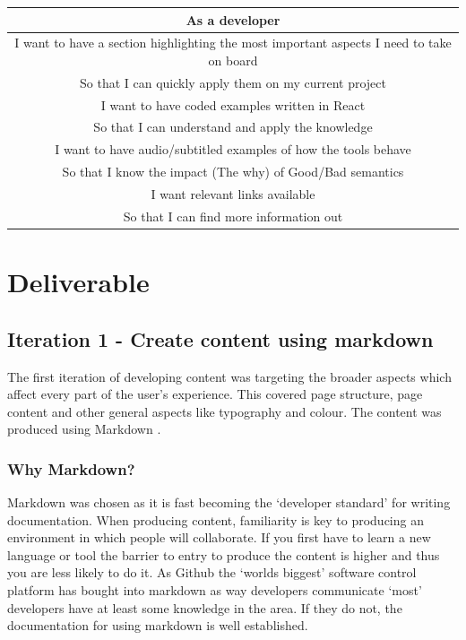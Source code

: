 \begin{center}
 \begin{tabular}{| c |}
 \hline
 As a developer \\
 \hline
 I want to have a section highlighting the most important aspects I need to
 take on board \\
 So that I can quickly apply them on my current project \\
 \hline
 I want to have coded examples written in React \\
 So that I can understand and apply the knowledge \\
 \hline
 I want to have audio/subtitled examples of how the tools behave  \\
 So that I know the impact (The why) of Good/Bad semantics  \\
 \hline
 I want relevant links available  \\
 So that I can find more information out  \\
 \hline
\end{tabular}
\end{center}

\section{Deliverable}
\subsection{Iteration 1 - Create content using markdown}
The first iteration of developing content was targeting the broader aspects
which affect every part of the user's experience. This covered page structure,
page content and other general aspects like typography and colour. The content was produced
using Markdown \citep{Markdown}.

\subsubsection{Why Markdown?}
Markdown was chosen as it is fast becoming the `developer standard' for writing
documentation. When producing content, familiarity is key to producing an
environment in which people will collaborate. If you first have to
learn a new language or tool the barrier to entry to produce the content is
higher and thus you are less likely to do it. As Github the `worlds biggest'
\citep{GithubBig} software control platform has bought into markdown as way
developers communicate `most' developers have at least some knowledge in the
area. If they do not, the documentation for using markdown is well established.

